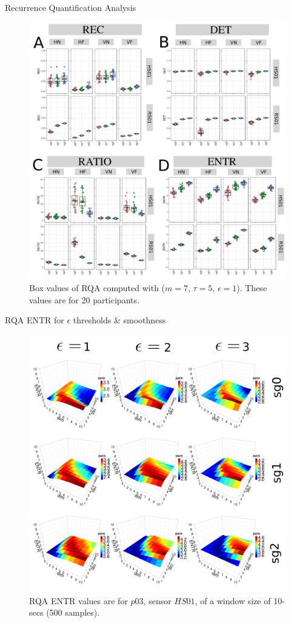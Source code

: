 {

\begin{frame}{Recurrence Quantification Analysis}
    \begin{figure}
        \includegraphics[width=0.45\linewidth]{./figs/results/ch6-rqa/versions/drawing-v00}{}
	\caption{Box values of  RQA computed with 
	($m=7$, $\tau=5$, $\epsilon=1$). 
	These values are for 20 participants.
} 
   \end{figure}
	
\end{frame}
}


{

\begin{frame}{RQA ENTR for $\epsilon$ thresholds
	\& smoothness
}
    \begin{figure}
        \includegraphics[width=0.45\linewidth]{./figs/results/rqa-epsilons/versions/drawing-v00}{}
	\caption{
	RQA ENTR values are for
	$p03$, sensor $HS01$, of a window size of 10-secs (500 samples).
} 
   \end{figure}
	
\end{frame}
}



